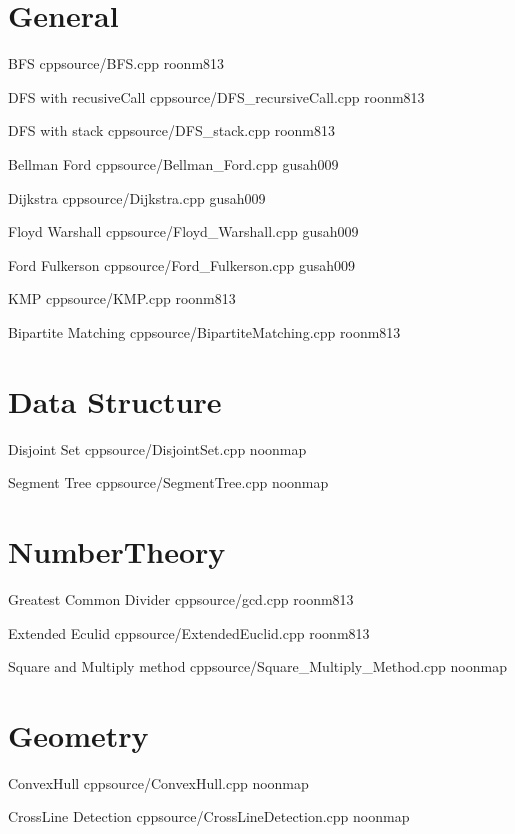 \documentclass[landscape, 10pt, a4paper, oneside, twocolumn]{extarticle}
\begin{document}
\maketitlepage



\section{General}

\Algorithm
{BFS}
{}
{}
{cpp}{source/BFS.cpp}
{roonm813}

\Algorithm
{DFS with recusiveCall}
{}
{}
{cpp}{source/DFS_recursiveCall.cpp}
{roonm813}

\Algorithm
{DFS with stack}
{}
{}
{cpp}{source/DFS_stack.cpp}
{roonm813}

\Algorithm
{Bellman Ford}
{}
{}
{cpp}{source/Bellman_Ford.cpp}
{gusah009}

\Algorithm
{Dijkstra}
{}
{}
{cpp}{source/Dijkstra.cpp}
{gusah009}

\Algorithm
{Floyd Warshall}
{}
{}
{cpp}{source/Floyd_Warshall.cpp}
{gusah009}

\Algorithm
{Ford Fulkerson}
{}
{}
{cpp}{source/Ford_Fulkerson.cpp}
{gusah009}

\Algorithm
{KMP}
{}
{}
{cpp}{source/KMP.cpp}
{roonm813}


\Algorithm
{Bipartite Matching}
{}
{}
{cpp}{source/BipartiteMatching.cpp}
{roonm813}


\section{Data Structure}

\Algorithm
{Disjoint Set}
{}
{}
{cpp}{source/DisjointSet.cpp}
{noonmap}

\Algorithm
{Segment Tree}
{}
{}
{cpp}{source/SegmentTree.cpp}
{noonmap}


\section{NumberTheory}

\Algorithm
{Greatest Common Divider}
{}
{}
{cpp}{source/gcd.cpp}
{roonm813}


\Algorithm
{Extended Eculid}
{}
{}
{cpp}{source/ExtendedEuclid.cpp}
{roonm813}

\Algorithm
{Square and Multiply method}
{}
{}
{cpp}{source/Square_Multiply_Method.cpp}
{noonmap}

\section{Geometry}

\Algorithm
{ConvexHull}
{}
{}
{cpp}{source/ConvexHull.cpp}
{noonmap}

\Algorithm
{CrossLine Detection}
{}
{}
{cpp}{source/CrossLineDetection.cpp}
{noonmap}
\end{document}
